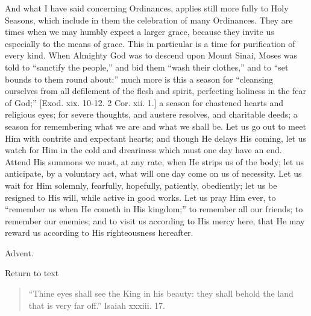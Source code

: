 And what I have said concerning Ordinances, applies still more
fully to Holy Seasons, which include in them the celebration of many
Ordinances. They are times when we may humbly expect a larger grace,
because they invite us especially to the means of grace. This in
particular is a time for purification of every kind. When Almighty God
was to descend upon Mount Sinai, Moses was told to ``sanctify the
people,'' and bid them ``wash their clothes,'' and to
``set bounds to them round about:'' much more is this a season
for ``cleansing ourselves from all defilement of the flesh and
spirit, perfecting holiness in the fear of God;'' [Exod. xix.
10-12. 2 Cor. xii. 1.] a season for chastened hearts and religious
eyes; for severe thoughts, and austere resolves, and charitable deeds;
a season for remembering what we are and what we shall be. Let us go
out to meet Him with contrite and expectant hearts; and though He
delays His coming, let us watch for Him in the cold and dreariness
which must one day have an end. Attend His summons we must, at any
rate, when He strips us of the body; let us anticipate, by a voluntary
act, what will one day come on us of necessity. Let us wait for Him
solemnly, fearfully, hopefully, patiently, obediently; let us be
resigned to His will, while active in good works. Let us pray Him
ever, to ``remember us when He cometh in His kingdom;'' to
remember all our friends; to remember our enemies; and to visit us
according to His mercy here, that He may reward us according to His
righteousness hereafter.


Advent.

Return to text


\begin{quote}

``Thine eyes shall see the King in his beauty: they shall
behold the land that is very far off.'' Isaiah xxxiii. 17.

\end{quote}

